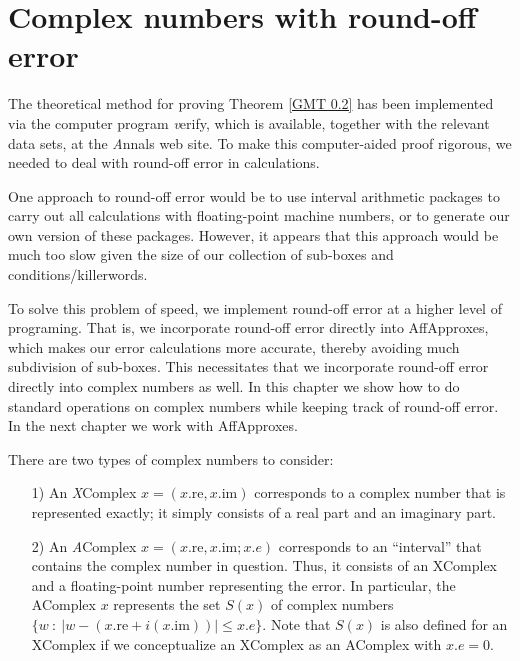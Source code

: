 \chapter{Complex numbers with round-off error}\label{Ch.XComplex} %


\begin{remark} \label{GMT remark7.1}
The theoretical method for proving Theorem \ref{GMT 0.2}
has been implemented via the computer program {\textit verify}, which is available, together with the relevant data sets, at the {\textit Annals} web site.  To make this computer-aided proof rigorous, we needed to deal with round-off error in calculations.  

One approach to round-off error would be to use interval arithmetic packages to carry out all calculations with floating-point machine numbers, or to generate our own version of these packages.  
However, it appears that this approach
would be much too slow given the size of our collection of sub-boxes and conditions/killerwords.  

To solve this problem of speed, we implement round-off error at a higher level of programing.  That is, we incorporate round-off error directly
 into AffApproxes,  which makes our error calculations more accurate, thereby avoiding much subdivision of
sub-boxes. This necessitates that we incorporate round-off error directly into complex numbers as well. 
In this chapter we show how to do standard operations on complex numbers while keeping track of round-off error.
In the next chapter we work with  AffApproxes.\end{remark}

\begin{definition}\label{GMT def7.2}
There are two types of complex numbers to consider: 

\begin{itemize}
\item[1)]  An {\textit XComplex} $x = (x.\mathrm {re}, x.\mathrm {im})$ corresponds to a complex number that is represented exactly; it
simply consists of a real part and an imaginary part.

\item[2)]  An {\textit AComplex} $x = (x.\mathrm {re}, x.\mathrm {im}; x.e)$ corresponds to an ``interval'' that contains the complex number in
question.  Thus, it consists of an XComplex and a floating-point number representing the error.  In particular, the AComplex
$x$ represents the set $S(x)$ of complex numbers 
$\{w\ :\ |w - (x.\mathrm {re} + i (x.\mathrm {im}))| \le x.e\}$.  Note that $S(x)$ is also defined
for an XComplex if we conceptualize an XComplex as an AComplex with
$x.e = 0.$
\end{itemize}

\end{definition}

